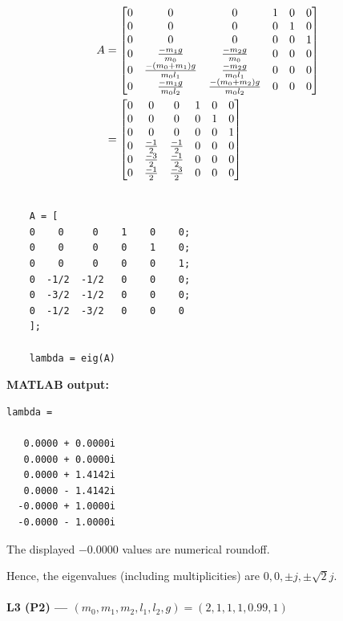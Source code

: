 \documentclass[12pt,a4paper]{article}
\begin{document}
\begin{align*}
A &= \begin{bmatrix}
	0 & 0 & 0 & 1 & 0 & 0 \\
	0 & 0 & 0 & 0 & 1 & 0 \\
	0 & 0 & 0 & 0 & 0 & 1 \\
	0 & {-m_1g\over m_0} & {-m_2g\over m_0} & 0 & 0 & 0 \\
	0 & {-(m_0 + m_1)g \over m_0l_1} & {-m_2g\over m_0l_1} & 0 & 0 &0\\
	0 & {-m_1g\over m_0 l_2} & {-(m_0 + m_2)g\over m_0l_2} & 0 & 0 & 0
\end{bmatrix} \\
&=\begin{bmatrix}
	0 & 0 & 0 & 1 & 0 & 0 \\
	0 & 0 & 0 & 0 & 1 & 0 \\
	0 & 0 & 0 & 0 & 0 & 1 \\
	0 & {-1\over 2} & {-1\over 2} & 0 & 0 & 0 \\
	0 & {-3 \over 2} & {-1\over 2} & 0 & 0 &0\\
	0 & {-1\over 2} & {-3\over2} & 0 & 0 & 0
\end{bmatrix}
\end{align*}

\begin{lstlisting}

	A = [
	0    0     0    1    0    0;
	0    0     0    0    1    0;
	0    0     0    0    0    1;
	0  -1/2  -1/2   0    0    0;
	0  -3/2  -1/2   0    0    0;
	0  -1/2  -3/2   0    0    0
	];

	lambda = eig(A)
\end{lstlisting}

\textbf{MATLAB output:}
\begin{lstlisting}[language={}]
lambda =

   0.0000 + 0.0000i
   0.0000 + 0.0000i
   0.0000 + 1.4142i
   0.0000 - 1.4142i
  -0.0000 + 1.0000i
  -0.0000 - 1.0000i
\end{lstlisting}
The displayed $-0.0000$ values are numerical roundoff.


Hence, the eigenvalues (including multiplicities) are $0,0,\pm j,\pm\sqrt{2}j$.

\vspace{0.3cm}

\Needspace{2cm}
\paragraph*{L3 (P2) --- $(m_0,m_1,m_2,l_1,l_2,g)=(2,1,1,1,0.99,1)$}
\end{document}

